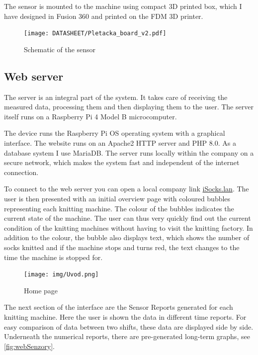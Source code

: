 \documentclass[12pt, a4paper]{article}
\begin{document}
The sensor is mounted to the machine using compact 3D printed box, which I have designed in Fusion 360 and printed on the FDM 3D printer.

\begin{figure}[htbp]
    \centering
    \texttt{[image: DATASHEET/Pletacka\_board\_v2.pdf]}
    \caption{Schematic of the sensor}
    \label{fig:Schemav1}
\end{figure}

\subsection*{Web server}

The server is an integral part of the system. It takes care of receiving the measured data, processing them and then displaying them to the user.
The server itself runs on a Raspberry Pi 4 Model B microcomputer.

The device runs the Raspberry Pi OS operating system with a graphical interface.
The website runs on an Apache2 HTTP server and PHP 8.0.
As a database system I use MariaDB.
The server runs locally within the company on a secure network, which makes the system fast and independent of the internet connection.

To connect to the web server you can open a local company link \newline\href{http://iSocks.lan}{iSocks.lan}.
The user is then presented with an initial overview page with coloured bubbles representing each knitting machine.
The colour of the bubbles indicates the current state of the machine.
The user can thus very quickly find out the current condition of the knitting machines without having to visit the knitting factory.
In addition to the colour, the bubble also displays text, which shows the number of socks knitted and if the machine stops and turns red, the text changes to the time the machine is stopped for.



\begin{figure}[t]
    \centering
    \texttt{[image: img/Uvod.png]}
    \caption{Home page}
    \label{fig:webUvod}
\end{figure}

The next section of the interface are the Sensor Reports generated for each knitting machine.
Here the user is shown the data in different time reports.
For easy comparison of data between two shifts, these data are displayed side by side.
Underneath the numerical reports, there are pre-generated long-term graphs, see \ref{fig:webSenzory}.
\end{document}
